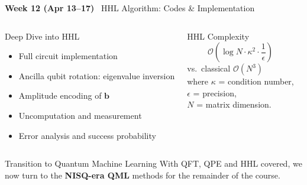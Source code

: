 \documentclass[aspectratio=169,10pt]{beamer}
\newcommand{\week}[1]{\textcolor{blue!60!black}{\textbf{#1}}}
\begin{document}
\begin{frame}{\week{Week 12 (Apr 13--17)} \ HHL Algorithm: Codes \& Implementation}
  \begin{columns}[T]
      \begin{block}{Deep Dive into HHL}
        \begin{itemize}
          \item Full circuit implementation
          \item Ancilla qubit rotation: eigenvalue inversion
          \item Amplitude encoding of $\bm{b}$
          \item Uncomputation and measurement
          \item Error analysis and success probability
        \end{itemize}
      \end{block}
      \begin{alertblock}{HHL Complexity}
        \[
          \mathcal{O}\!\left(\log N \cdot \kappa^2 \cdot \frac{1}{\epsilon}\right)
        \]
        vs.\ classical $\mathcal{O}(N^3)$\\[4pt]
        where $\kappa$ = condition number,\\
        $\epsilon$ = precision,\\
        $N$ = matrix dimension.
      \end{alertblock}
    \end{columns}
    \vspace{4pt}
    \begin{block}{Transition to Quantum Machine Learning}
      With QFT, QPE and HHL covered, we now turn to the
      \textbf{NISQ-era QML} methods for the remainder of the course.
    \end{block}
\end{frame}
\end{document}
